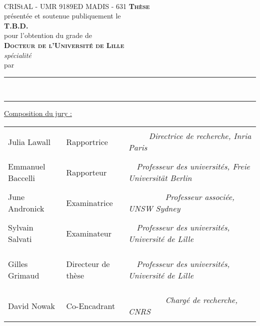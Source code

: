 \begin{titlepage}
    \sffamily
    \begin{center}
	{
        	\def\svgwidth{20 em}
		\\
		{\tiny{CRIStAL - UMR 9189}\hfil{ED MADIS - 631}}
	}
        \vfil
	{
		{
			{\Huge{\textsc{\textbf{Thèse}}}}
		}\\[1 em]
		{
			{présentée et soutenue publiquement le}\\
			{\textbf{T.B.D.}}
		}\\[1 em]
		{
			{pour l'obtention du grade de}\\
			{\LARGE{\textsc{\textbf{Docteur de l'Université de Lille}}}}\\
			{\large\textit{spécialité \printProgram}}
		}\\[1 em]
		{
			{par}\\[0.3 em]
			{\Large\textbf{\printAuthor}}
		}
	}
        \vfil
        {\LARGE
            \rule[1 ex]{\textwidth}{1.5 pt}
            \onehalfspacing\printTitleBold\\[1 ex]
            \rule[-1 ex]{\textwidth}{1.5 pt}
        }
    \end{center}
    
    \vfil
	{\small \centering \underline{Composition du jury :}}
    \begin{table}[h]
	\small
        \sffamily 
        {%
	    \begin{tabular}{
		>{\raggedright\arraybackslash}p{}
		>{\bfseries\raggedright\arraybackslash}p{}%
		>{\itshape\raggedleft\arraybackslash}p{}
	    }
		Julia Lawall		& Rapportrice		& ~~~~~Directrice de recherche, Inria Paris\\
		Emmanuel Baccelli	& Rapporteur		& ~~Professeur des universités, Freie Universität Berlin\\
		June Andronick		& Examinatrice		& ~~~~~~~~~Professeur associée, UNSW Sydney\\
		Sylvain Salvati		& Examinateur		& ~~Professeur des universités, Université de Lille\\
		Gilles Grimaud		& Directeur de thèse	& ~~Professeur des universités, Université de Lille\\
		David Nowak		& Co-Encadrant		& ~~~~~~~~~Chargé de recherche, CNRS\\
            \end{tabular}
        }
    \end{table}
\end{titlepage}

\restoregeometry
